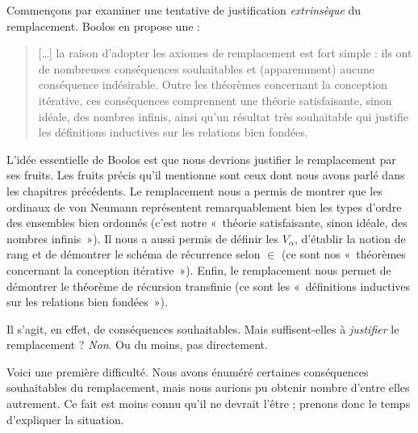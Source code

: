 \documentclass[../../../include/open-logic-section]{subfiles}
\begin{document}

Commençons par examiner une tentative de justification
\emph{extrinsèque} du remplacement. Boolos en propose une :
\begin{quote}
  [\ldots] la raison d'adopter les axiomes de remplacement est fort
  simple : ils ont de nombreuses conséquences souhaitables et
  (apparemment) aucune conséquence indésirable. Outre les théorèmes
  concernant la conception itérative, ces conséquences comprennent
  une théorie satisfaisante, sinon idéale, des nombres infinis, ainsi
  qu'un résultat très souhaitable qui justifie les définitions
  inductives sur les relations bien fondées.
  \citep[229]{Boolos1971}
\end{quote}
L'idée essentielle de Boolos est que nous devrions justifier le
remplacement par ses fruits. Les fruits précis qu'il mentionne sont
ceux dont nous avons parlé dans les chapitres précédents. Le
remplacement nous a permis de montrer que les ordinaux de von Neumann
représentent remarquablement bien les types d'ordre des ensembles
bien ordonnés (c'est notre «~théorie satisfaisante, sinon idéale,
des nombres infinis~»).
Il nous a aussi permis de définir les $V_\alpha$, d'établir la notion
de rang et de démontrer le schéma de récurrence selon $\in$ (ce sont
nos «~théorèmes concernant la conception itérative~»). Enfin, le
remplacement nous permet de démontrer le théorème de récursion
transfinie (ce sont les «~définitions inductives sur les relations
bien fondées~»).

Il s'agit, en effet, de conséquences souhaitables. Mais suffisent-elles
à \emph{justifier} le remplacement ? \emph{Non}. Ou du moins, pas
directement.

Voici une première difficulté. Nous avons énuméré certaines conséquences
souhaitables du remplacement, mais nous aurions pu obtenir nombre
d'entre elles autrement. Ce fait est moins connu qu'il ne devrait
l'être ; prenons donc le temps d'expliquer la situation.
\end{document}

